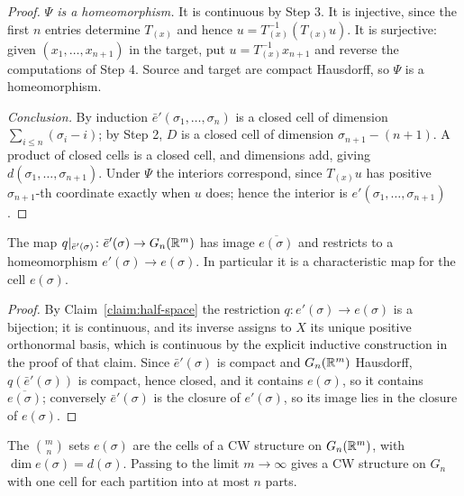 \begin{proof}
 \emph{$\Psi$ is a homeomorphism.} It is continuous by Step 3. It is
injective, since the first $n$ entries determine $T_{(x)}$ and hence
$u=T_{(x)}^{-1}(T_{(x)}u)$. It is surjective: given
$(x_1,\dots,x_{n+1})$ in the target, put $u=T_{(x)}^{-1}x_{n+1}$ and reverse the
computations of Step 4. Source and target are compact Hausdorff, so $\Psi$ is a
homeomorphism.

 \emph{Conclusion.} By induction $\bar e'(\sigma_1,\dots,\sigma_n)$ is a
closed cell of dimension $\sum_{i\le n}(\sigma_i-i)$; by Step 2, $D$ is a closed
cell of dimension $\sigma_{n+1}-(n+1)$. A product of closed cells is a closed
cell, and dimensions add, giving $d(\sigma_1,\dots,\sigma_{n+1})$. Under $\Psi$
the interiors correspond, since $T_{(x)}u$ has positive $\sigma_{n+1}$-th
coordinate exactly when $u$ does; hence the interior is
$e'(\sigma_1,\dots,\sigma_{n+1})$.
\end{proof}

\begin{lemma}\label{lem:q-characteristic}
The map $q|_{\bar e'(\sigma)}\colon\bar e'(\sigma)\to G_n(\mathbb{R}^m)$ has image
$\overline{e(\sigma)}$ and restricts to a homeomorphism
$e'(\sigma)\to e(\sigma)$. In particular it is a characteristic map for the cell
$e(\sigma)$.
\end{lemma}

\begin{proof}
By Claim~\ref{claim:half-space} the restriction $q\colon e'(\sigma)\to e(\sigma)$
is a bijection; it is continuous, and its inverse assigns to $X$ its unique
positive orthonormal basis, which is continuous by the explicit inductive
construction in the proof of that claim. Since $\bar e'(\sigma)$ is compact and
$G_n(\mathbb{R}^m)$ Hausdorff, $q(\bar e'(\sigma))$ is compact, hence closed, and it
contains $e(\sigma)$, so it contains $\overline{e(\sigma)}$; conversely
$\bar e'(\sigma)$ is the closure of $e'(\sigma)$, so its image lies in the
closure of $e(\sigma)$.
\end{proof}

\begin{theorem}\label{thm:cw-grassmannian}
The $\binom{m}{n}$ sets $e(\sigma)$ are the cells of a CW structure on
$G_n(\mathbb{R}^m)$, with $\dim e(\sigma)=d(\sigma)$. Passing to the limit $m\to\infty$
gives a CW structure on $G_n$ with one cell for each partition into at most $n$
parts.
\end{theorem}

